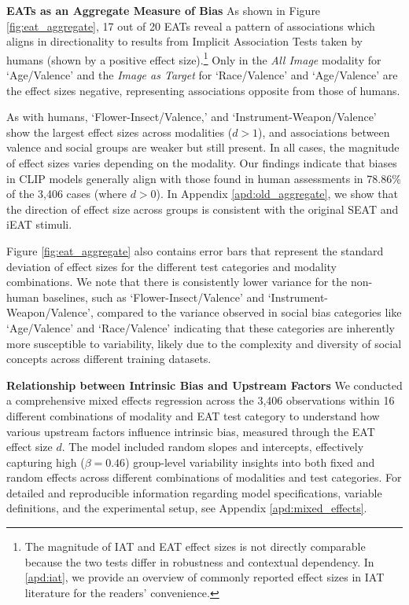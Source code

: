 \noindent\textbf{EATs as an Aggregate Measure of Bias} As shown in Figure \ref{fig:eat_aggregate}, 17 out of 20 EATs reveal a pattern of associations which aligns in directionality to results from Implicit Association Tests taken by humans (shown by a positive effect size).\footnote{The magnitude of IAT and EAT effect sizes is not directly comparable because the two tests differ in robustness and contextual dependency. In \ref{apd:iat}, we provide an overview of commonly reported effect sizes in IAT literature for the readers' convenience.} Only in the \textit{All Image} modality for `Age/Valence' and the \textit{Image as Target} for `Race/Valence' and `Age/Valence' are the effect sizes negative, representing associations opposite from those of humans. 

As with humans, `Flower-Insect/Valence,' and `Instrument-Weapon/Valence' show the largest effect sizes across modalities ($d>1$), and associations between valence and social groups are weaker but still present. In all cases, the magnitude of effect sizes varies depending on the modality. Our findings indicate that biases in CLIP models generally align with those found in human assessments in 78.86\% of the 3,406 cases (where $d>0$). In Appendix \ref{apd:old_aggregate}, we show that the direction of effect size across groups is consistent with the original SEAT and iEAT stimuli. 

Figure \ref{fig:eat_aggregate} also contains error bars that represent the standard deviation of effect sizes for the different test categories and modality combinations. We note that there is consistently lower variance for the non-human baselines, such as `Flower-Insect/Valence' and `Instrument-Weapon/Valence', compared to the variance observed in social bias categories like `Age/Valence' and `Race/Valence' indicating that these categories are inherently more susceptible to variability, likely due to the complexity and diversity of social concepts across different training datasets. 

\noindent\textbf{Relationship between Intrinsic Bias and Upstream Factors} We conducted a comprehensive mixed effects regression across the 3,406 observations within 16 different combinations of modality and EAT test category to understand how various upstream factors influence intrinsic bias, measured through the EAT effect size $d$. The model included random slopes and intercepts, effectively capturing high ($\beta=0.46$) group-level variability insights into both fixed and random effects across different combinations of modalities and test categories. For detailed and reproducible information regarding model specifications, variable definitions, and the experimental setup, see Appendix \ref{apd:mixed_effects}.



